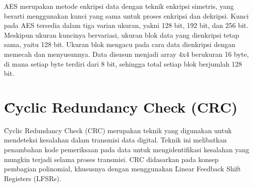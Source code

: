 AES merupakan metode enkripsi data dengan teknik enkripsi simetris, yang berarti menggunakan kunci yang sama untuk proses enkripsi dan dekripsi. Kunci pada AES tersedia dalam tiga varian ukuran, yakni 128 bit, 192 bit, dan 256 bit. Meskipun ukuran kuncinya bervariasi, ukuran blok data yang dienkripsi tetap sama, yaitu 128 bit. Ukuran blok mengacu pada cara data dienkripsi dengan memecah dan menyusunnya. Data disusun menjadi array 4x4 berukuran 16 byte, di mana setiap byte terdiri dari 8 bit, sehingga total setiap blok berjumlah 128 bit\cite{NistAes}.



\section{\f{Cyclic Redundancy Check} (CRC)}
\f{Cyclic Redundancy Check} (CRC) merupakan teknik yang digunakan untuk mendeteksi kesalahan dalam transmisi data digital. Teknik ini melibatkan penambahan kode pemeriksaan pada data untuk mengidentifikasi kesalahan yang mungkin terjadi selama proses transmisi. CRC didasarkan pada konsep pembagian polinomial, khususnya dengan menggunakan \f{Linear Feedback Shift Registers} (LFSRs).

